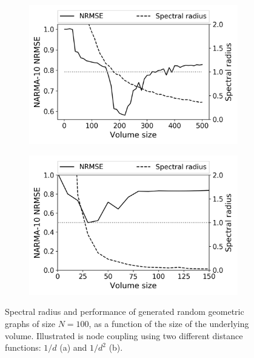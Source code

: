 \begin{figure}[t!]
  \centering
  \begin{subfigure}{.49\textwidth}
    \centering
    \includegraphics[width=1.0\linewidth]{figures/RGG-volume-size-inv.png}
    \caption{}
    \label{fig:size-graph-volume-a}
  \end{subfigure}
  \begin{subfigure}{.49\textwidth}
    \centering
    \includegraphics[width=1.0\linewidth]{figures/RGG-volume-size-inv-squared.png}
    \caption{}
    \label{fig:size-graph-volume-b}
  \end{subfigure}
  \caption{
    Spectral radius and performance of generated random geometric graphs of size
$N = 100$, as a function of the size of the underlying volume. Illustrated is
node coupling using two different distance functions: $1/d$ (a) and $1/d^2$ (b).
  }
  \label{fig:size-graph-volume}
\end{figure}

